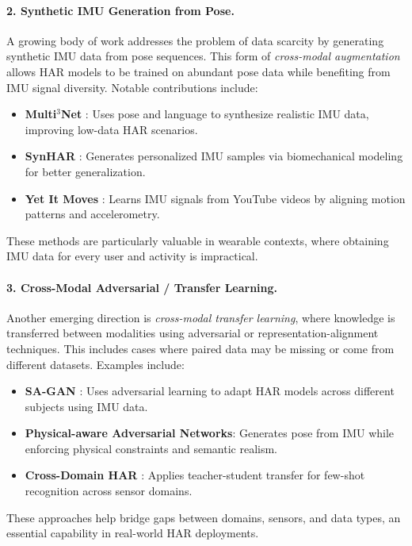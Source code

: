 \paragraph{2. Synthetic IMU Generation from Pose.}
A growing body of work addresses the problem of data scarcity by generating synthetic IMU data from pose sequences. This form of \textit{cross-modal augmentation} allows HAR models to be trained on abundant pose data while benefiting from IMU signal diversity. Notable contributions include:
\begin{itemize}
    \item \textbf{Multi$^3$Net} \cite{fortes2024enhancing}: Uses pose and language to synthesize realistic IMU data, improving low-data HAR scenarios.
    \item \textbf{SynHAR} \cite{uhlenberg2024synhar}: Generates personalized IMU samples via biomechanical modeling for better generalization.
    \item \textbf{Yet It Moves} \cite{rey2020yet}: Learns IMU signals from YouTube videos by aligning motion patterns and accelerometry.
\end{itemize}
These methods are particularly valuable in wearable contexts, where obtaining IMU data for every user and activity is impractical.

\paragraph{3. Cross-Modal Adversarial / Transfer Learning.}
Another emerging direction is \textit{cross-modal transfer learning}, where knowledge is transferred between modalities using adversarial or representation-alignment techniques. This includes cases where paired data may be missing or come from different datasets. Examples include:
\begin{itemize}
    \item \textbf{SA-GAN} \cite{soleimani2021cross}: Uses adversarial learning to adapt HAR models across different subjects using IMU data.
    \item \textbf{Physical-aware Adversarial Networks}: Generates pose from IMU while enforcing physical constraints and semantic realism.
    \item \textbf{Cross-Domain HAR} \cite{thukral2025cross}: Applies teacher-student transfer for few-shot recognition across sensor domains.
\end{itemize}
These approaches help bridge gaps between domains, sensors, and data types, an essential capability in real-world HAR deployments.

